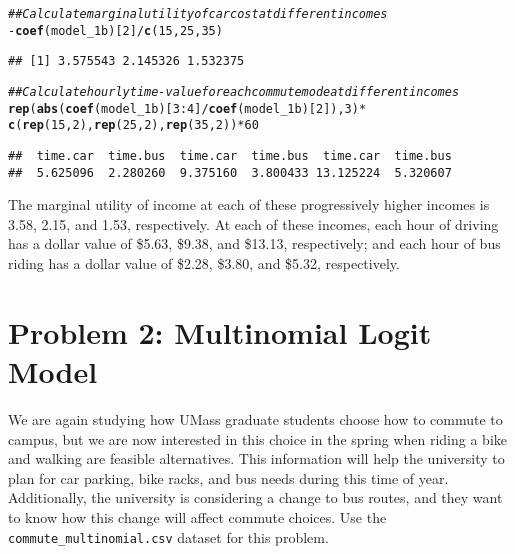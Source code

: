 \documentclass[11pt,letterpaper]{article}\usepackage[]{graphicx}\usepackage[]{xcolor}
\makeatletter
\newcommand{\hlnum}[1]{\textcolor[rgb]{0.686,0.059,0.569}{#1}}%
\newcommand{\hlcom}[1]{\textcolor[rgb]{0.678,0.584,0.686}{\textit{#1}}}%
\newcommand{\hlopt}[1]{\textcolor[rgb]{0,0,0}{#1}}%
\newcommand{\hlstd}[1]{\textcolor[rgb]{0.345,0.345,0.345}{#1}}%
\newcommand{\hlkwd}[1]{\textcolor[rgb]{0.737,0.353,0.396}{\textbf{#1}}}%
\newenvironment{kframe}{%
 \def\at@end@of@kframe{}%
 \ifinner\ifhmode%
  \def\at@end@of@kframe{\end{minipage}}%
  \begin{minipage}{\columnwidth}%
 \fi\fi%
 \def\FrameCommand##1{\hskip\@totalleftmargin \hskip-\fboxsep
 \colorbox{shadecolor}{##1}\hskip-\fboxsep
     \hskip-\linewidth \hskip-\@totalleftmargin \hskip\columnwidth}%
 \MakeFramed {\advance\hsize-\width
   \@totalleftmargin\z@ \linewidth\hsize
   \@setminipage}}%
 {\par\unskip\endMakeFramed%
 \at@end@of@kframe}
\newenvironment{knitrout}{}{} %
\makeatother
\begin{document}
\begin{enumerate}[label=\alph*., leftmargin=*]
\begin{enumerate}[label=\roman*.]
\begin{knitrout}
\color{fgcolor}\begin{kframe}
\begin{alltt}
\hlcom{## Calculate marginal utility of car cost at different incomes}
\hlopt{-}\hlkwd{coef}\hlstd{(model_1b)[}\hlnum{2}\hlstd{]} \hlopt{/} \hlkwd{c}\hlstd{(}\hlnum{15}\hlstd{,} \hlnum{25}\hlstd{,} \hlnum{35}\hlstd{)}
\end{alltt}
\begin{verbatim}
## [1] 3.575543 2.145326 1.532375
\end{verbatim}
\begin{alltt}
\hlcom{## Calculate hourly time-value for each commute mode at different incomes}
\hlkwd{rep}\hlstd{(}\hlkwd{abs}\hlstd{(}\hlkwd{coef}\hlstd{(model_1b)[}\hlnum{3}\hlopt{:}\hlnum{4}\hlstd{]} \hlopt{/} \hlkwd{coef}\hlstd{(model_1b)[}\hlnum{2}\hlstd{]),} \hlnum{3}\hlstd{)} \hlopt{*}
  \hlkwd{c}\hlstd{(}\hlkwd{rep}\hlstd{(}\hlnum{15}\hlstd{,} \hlnum{2}\hlstd{),} \hlkwd{rep}\hlstd{(}\hlnum{25}\hlstd{,} \hlnum{2}\hlstd{),} \hlkwd{rep}\hlstd{(}\hlnum{35}\hlstd{,} \hlnum{2}\hlstd{))} \hlopt{*} \hlnum{60}
\end{alltt}
\begin{verbatim}
##  time.car  time.bus  time.car  time.bus  time.car  time.bus 
##  5.625096  2.280260  9.375160  3.800433 13.125224  5.320607
\end{verbatim}
\end{kframe}
\end{knitrout}

		The marginal utility of income at each of these progressively higher incomes is 3.58, 2.15, and 1.53, respectively. At each of these incomes, each hour of driving has a dollar value of \$5.63, \$9.38, and \$13.13, respectively; and each hour of bus riding has a dollar value of \$2.28, \$3.80, and \$5.32, respectively.
	\end{enumerate}
\end{enumerate}

\section*{Problem 2: Multinomial Logit Model}

We are again studying how UMass graduate students choose how to commute to campus, but we are now interested in this choice in the spring when riding a bike and walking are feasible alternatives. This information will help the university to plan for car parking, bike racks, and bus needs during this time of year. Additionally, the university is considering a change to bus routes, and they want to know how this change will affect commute choices. Use the \texttt{commute\_multinomial.csv} dataset for this problem.
\end{document}
